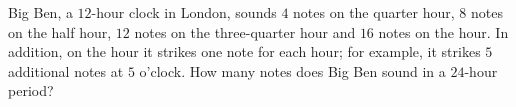Big Ben, a $12$-hour clock in London, sounds $4$ notes on the quarter hour, $8$ notes on the half hour, $12$ notes on the three-quarter hour and $16$ notes on the hour. In addition, on the hour it strikes one note for each hour; for example, it strikes $5$ additional notes at $5$ o'clock. How many notes does Big Ben sound in a $24$-hour period?
